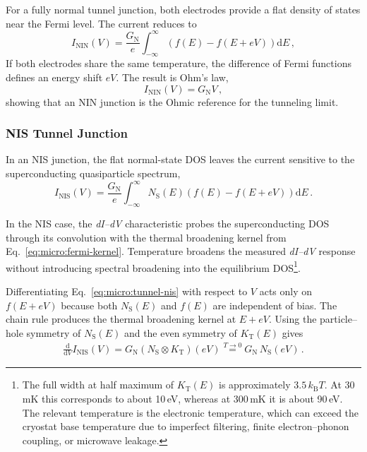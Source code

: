             For a fully normal tunnel junction, both electrodes provide a flat density of states near the Fermi level. The current reduces to
            \begin{equation}
                I_\mathrm{NIN}(V) = \frac{G_\mathrm{N}}{e} \int_{-\infty}^{\infty}\left(f(E) - f(E + eV)\right)\mathrm{d}E\,,
            \end{equation}
            If both electrodes share the same temperature, the difference of Fermi functions defines an energy shift $eV$. The result is Ohm's law,
            \begin{equation}
                I_\mathrm{NIN}(V) =  G_\mathrm{N}V\,,
            \end{equation}
            showing that an NIN junction is the Ohmic reference for the tunneling limit.

        \subsubsection*{NIS Tunnel Junction}

            In an NIS junction, the flat normal-state DOS leaves the current sensitive to the superconducting quasiparticle spectrum,
            \begin{equation}
                I_\mathrm{NIS}(V) = \frac{G_\mathrm{N}}{e} \int_{-\infty}^{\infty} N_\mathrm{S}(E) \left(f(E) - f(E + eV)\right) \mathrm{d}E\,.
                \label{eq:micro:tunnel-nis}
            \end{equation}

            In the NIS case, the \textit{dI--dV} characteristic probes the superconducting DOS through its convolution with the thermal broadening kernel from Eq.~\eqref{eq:micro:fermi-kernel}. Temperature broadens the measured \textit{dI--dV} response without introducing spectral broadening into the equilibrium DOS\footnote{
                The full width at half maximum of $K_\mathrm{T}(E)$ is approximately $3.5\,k_\mathrm{B}T$. At 30\,mK this corresponds to about 10\,\textmu eV, whereas at 300\,mK it is about 90\,\textmu eV. The relevant temperature is the electronic temperature, which can exceed the cryostat base temperature due to imperfect filtering, finite electron--phonon coupling, or microwave leakage.
            }.

            Differentiating Eq.~\eqref{eq:micro:tunnel-nis} with respect to $V$ acts only on $f(E+eV)$ because both $N_{\mathrm{S}}(E)$ and $f(E)$ are independent of bias. The chain rule produces the thermal broadening kernel at $E+eV$. Using the particle--hole symmetry of $N_\mathrm{S}(E)$ and the even symmetry of $K_\mathrm{T}(E)$ gives
            \begin{align}
                \tfrac{\mathrm{d}}{\mathrm{d}V}I_\mathrm{NIS}(V) = G_\mathrm{N} \left( N_\mathrm{S} \otimes K_\mathrm{T}\right)(eV) \overset{T\to 0}{=} G_\mathrm{N}\,N_\mathrm{S}(eV)\,.
            \end{align}


